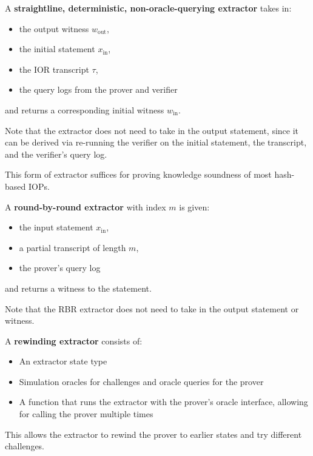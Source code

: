 \begin{definition}
    \label{def:straightline_extractor}
    A \textbf{straightline, deterministic, non-oracle-querying extractor} takes in:
    \begin{itemize}
        \item the output witness $w_{\text{out}}$,
        \item the initial statement $x_{\text{in}}$,
        \item the IOR transcript $\tau$,
        \item the query logs from the prover and verifier
    \end{itemize}
    and returns a corresponding initial witness $w_{\text{in}}$.

    Note that the extractor does not need to take in the output statement, since it can be derived
    via re-running the verifier on the initial statement, the transcript, and the verifier's query
    log.

    This form of extractor suffices for proving knowledge soundness of most hash-based IOPs.
\end{definition}

\begin{definition}
    \label{def:rbr_extractor}
    A \textbf{round-by-round extractor} with index $m$ is given:
    \begin{itemize}
        \item the input statement $x_{\text{in}}$,
        \item a partial transcript of length $m$,
        \item the prover's query log
    \end{itemize}
    and returns a witness to the statement.

    Note that the RBR extractor does not need to take in the output statement or witness.
\end{definition}

\begin{definition}
    \label{def:rewinding_extractor}
    A \textbf{rewinding extractor} consists of:
    \begin{itemize}
        \item An extractor state type
        \item Simulation oracles for challenges and oracle queries for the prover
        \item A function that runs the extractor with the prover's oracle interface, allowing for calling the prover multiple times
    \end{itemize}
    This allows the extractor to rewind the prover to earlier states and try different challenges.
\end{definition}


